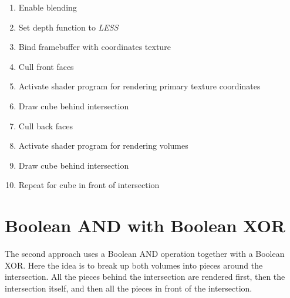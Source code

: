 \documentclass{report}
\begin{document}
\begin{enumerate}
  \item Enable blending
  \item Set depth function to \emph{LESS}
  \item Bind framebuffer with coordinates texture
  \item Cull front faces
  \item Activate shader program for rendering primary texture coordinates
  \item Draw cube behind intersection
  \item Cull back faces
  \item Activate shader program for rendering volumes
  \item Draw cube behind intersection
  \item Repeat for cube in front of intersection
\end{enumerate}

\section{Boolean AND with Boolean XOR}

The second approach uses a Boolean AND operation together with a Boolean XOR.
Here the idea is to break up both volumes into pieces around the intersection.
All the pieces behind the intersection are rendered first, then the intersection
itself, and then all the pieces in front of the intersection.
\end{document}
